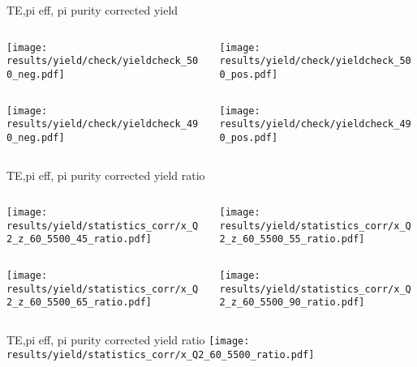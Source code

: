\begin{frame}{TE,pi eff, pi purity corrected yield}
\begin{columns}
\begin{column}[T]{0.5\textwidth}
\texttt{[image: results/yield/check/yieldcheck\_500\_neg.pdf]}
\end{column}
\begin{column}[T]{0.5\textwidth}
\texttt{[image: results/yield/check/yieldcheck\_500\_pos.pdf]}
\end{column}
\end{columns}
\begin{columns}
\begin{column}[T]{0.5\textwidth}
\texttt{[image: results/yield/check/yieldcheck\_490\_neg.pdf]}
\end{column}
\begin{column}[T]{0.5\textwidth}
\texttt{[image: results/yield/check/yieldcheck\_490\_pos.pdf]}
\end{column}
\end{columns}
\end{frame}
\begin{frame}{TE,pi eff, pi purity corrected yield ratio}
\begin{columns}
\begin{column}[T]{0.5\textwidth}
\texttt{[image: results/yield/statistics\_corr/x\_Q2\_z\_60\_5500\_45\_ratio.pdf]}
\end{column}
\begin{column}[T]{0.5\textwidth}
\texttt{[image: results/yield/statistics\_corr/x\_Q2\_z\_60\_5500\_55\_ratio.pdf]}
\end{column}
\end{columns}
\begin{columns}
\begin{column}[T]{0.5\textwidth}
\texttt{[image: results/yield/statistics\_corr/x\_Q2\_z\_60\_5500\_65\_ratio.pdf]}
\end{column}
\begin{column}[T]{0.5\textwidth}
\texttt{[image: results/yield/statistics\_corr/x\_Q2\_z\_60\_5500\_90\_ratio.pdf]}
\end{column}
\end{columns}
\end{frame}
\begin{frame}{TE,pi eff, pi purity corrected yield ratio}
\texttt{[image: results/yield/statistics\_corr/x\_Q2\_60\_5500\_ratio.pdf]}
\end{frame}
